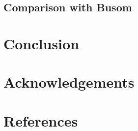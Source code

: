 \documentclass{article}
\begin{document}
   \subsection{Comparison with Busom}
   \section{Conclusion}
   \section{Acknowledgements}
   \section{References}
\end{document}
